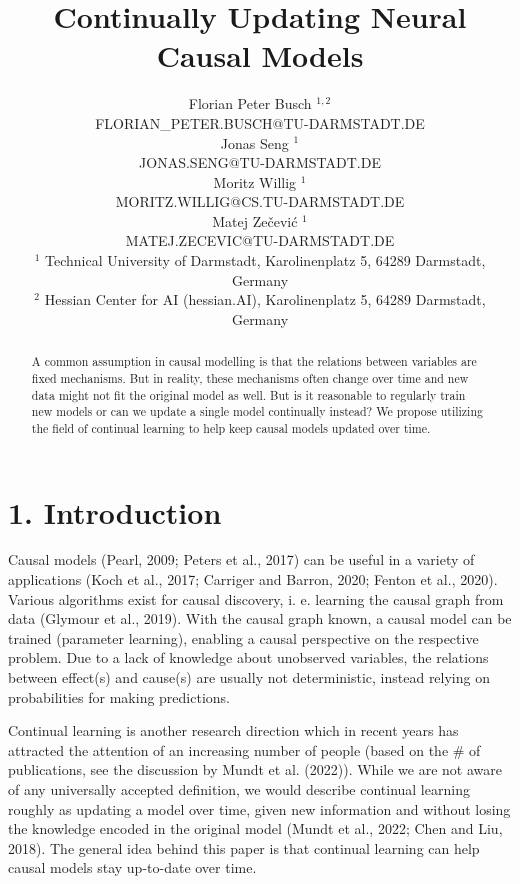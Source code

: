\documentclass[10pt]{article}
\title{Continually Updating Neural Causal Models }
\author{Florian Peter Busch ${ }^{1,2}$\\
FLORIAN\_PETER.BUSCH@TU-DARMSTADT.DE\\
Jonas Seng ${ }^{1}$\\
JONAS.SENG@TU-DARMSTADT.DE\\
Moritz Willig ${ }^{1}$\\
MORITZ.WILLIG@CS.TU-DARMSTADT.DE\\
Matej Zečević ${ }^{1}$\\
MATEJ.ZECEVIC@TU-DARMSTADT.DE\\
${ }^{1}$ Technical University of Darmstadt, Karolinenplatz 5, 64289 Darmstadt, Germany\\
${ }^{2}$ Hessian Center for AI (hessian.AI), Karolinenplatz 5, 64289 Darmstadt, Germany}
\date{}
\begin{document}
\maketitle


\begin{abstract}
A common assumption in causal modelling is that the relations between variables are fixed mechanisms. But in reality, these mechanisms often change over time and new data might not fit the original model as well. But is it reasonable to regularly train new models or can we update a single model continually instead? We propose utilizing the field of continual learning to help keep causal models updated over time.
\end{abstract}

\section*{1. Introduction}
Causal models (Pearl, 2009; Peters et al., 2017) can be useful in a variety of applications (Koch et al., 2017; Carriger and Barron, 2020; Fenton et al., 2020). Various algorithms exist for causal discovery, i. e. learning the causal graph from data (Glymour et al., 2019). With the causal graph known, a causal model can be trained (parameter learning), enabling a causal perspective on the respective problem. Due to a lack of knowledge about unobserved variables, the relations between effect(s) and cause(s) are usually not deterministic, instead relying on probabilities for making predictions.

Continual learning is another research direction which in recent years has attracted the attention of an increasing number of people (based on the $\#$ of publications, see the discussion by Mundt et al. (2022)). While we are not aware of any universally accepted definition, we would describe continual learning roughly as updating a model over time, given new information and without losing the knowledge encoded in the original model (Mundt et al., 2022; Chen and Liu, 2018). The general idea behind this paper is that continual learning can help causal models stay up-to-date over time.
\end{document}
